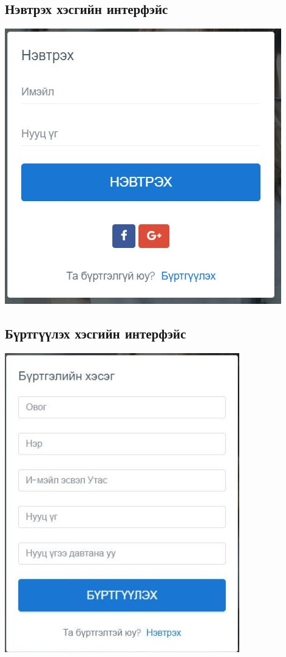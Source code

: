 \documentclass[
oneside, %
english, %
onehalfspacing, %
nolistspacing, %
headsepline, %
]{article} %
\begin{document}
     	\subsection{Нэвтрэх хэсгийн интерфэйс}
     \includegraphics[width=\textwidth]{login}
     \subsection{Бүртгүүлэх хэсгийн интерфэйс}
     \includegraphics[width=\textwidth]{delgets}
\end{document}
